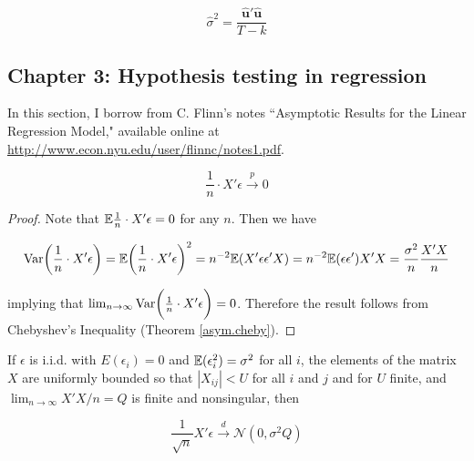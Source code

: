 \[
\hat{\sigma}^2 = \frac{ \hat{\boldsymbol{u}}'  \hat{\boldsymbol{u}}}{T - k}
\]

\subsection{Chapter 3: Hypothesis testing in regression}

In this section, I borrow from C. Flinn's notes ``Asymptotic Results for the Linear Regression Model," available online at \url{http://www.econ.nyu.edu/user/flinnc/notes1.pdf}.


\begin{lemma} 

\[
\frac{1}{n} \cdot X' \epsilon \xrightarrow{p} 0
\]
\end{lemma}
\begin{proof}Note that \(\E \frac{1}{n} \cdot X' \epsilon = 0\) for any \(n\). Then we have

\[
\Var \bigg( \frac{1}{n} \cdot X' \epsilon \bigg) = \E\bigg( \frac{1}{n} \cdot X' \epsilon \bigg) ^2 = n^{-2} \E(X' \epsilon \epsilon' X)  = n^{-2} \E(\epsilon \epsilon' )X'X = \frac{\sigma^2}{n}  \frac{X'X}{n}
\]

implying that \(\lim_{n \to \infty} \Var \bigg( \frac{1}{n} \cdot X' \epsilon \bigg)=0\). Therefore the result follows from Chebyshev's Inequality (Theorem \ref{asym.cheby}). 
\end{proof}

\begin{lemma}\label{linreg.lemma.2.1} If \(\epsilon\) is i.i.d. with \(E(\epsilon_i) = 0\) and \(\E(\epsilon_i^2) = \sigma^2\) for all \(i\), the elements of the matrix \(X\) are uniformly bounded so that \(|X_{ij}| < U \) for all \(i\) and \(j\) and for \(U\) finite, and \(\lim_{n \to \infty} X'X/n = Q\) is finite and nonsingular, then

\[
\frac{1}{\sqrt{n}} X' \epsilon \xrightarrow{d} \mathcal{N}(0, \sigma^2 Q)
\]
\end{lemma}

